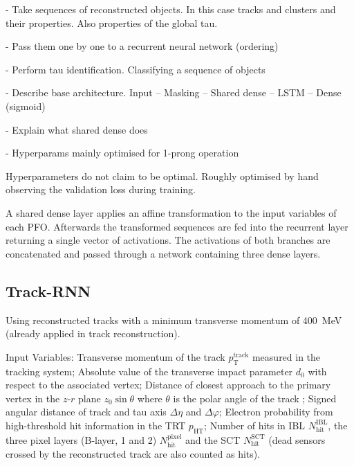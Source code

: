 - Take sequences of reconstructed objects. In this case tracks and clusters and
their properties. Also properties of the global tau.

- Pass them one by one to a recurrent neural network (ordering)

- Perform tau identification. Classifying a sequence of objects

- Describe base architecture. Input -- Masking -- Shared dense -- LSTM -- Dense (sigmoid)

- Explain what shared dense does

- Hyperparams mainly optimised for 1-prong operation

Hyperparameters do not claim to be optimal. Roughly optimised by hand observing the validation loss during training.




A shared
dense layer applies an affine transformation to the input variables of each PFO.
Afterwards the transformed sequences are fed into the recurrent layer returning
a single vector of activations.
The activations of both branches are
concatenated  and
passed through a network containing three dense layers.



\subsection{Track-RNN}
\label{sec:rnn_tracks}



Using reconstructed tracks with a minimum transverse momentum of
\SI{400}{\mega\electronvolt} (already applied in track reconstruction).

Input Variables: Transverse momentum of the track $p_\text{T}^\text{track}$
measured in the tracking system; Absolute value of the transverse impact
parameter $d_0$ with respect to the associated vertex; Distance of closest
approach to the primary vertex in the $z$-$r$ plane $z_0 \sin\theta$ where
$\theta$ is the polar angle of the track ; Signed angular distance of track and tau axis $\Delta \eta$ and
$\Delta \varphi$; Electron probability from high-threshold hit information in
the TRT $p_\text{HT}$; Number of hits in IBL $N_\text{hit}^\text{IBL}$, the
three pixel layers (B-layer, 1 and 2) $N_\text{hit}^\text{pixel}$ and the SCT
$N_\text{hit}^\text{SCT}$ (dead sensors crossed by the reconstructed track are
also counted as hits).

